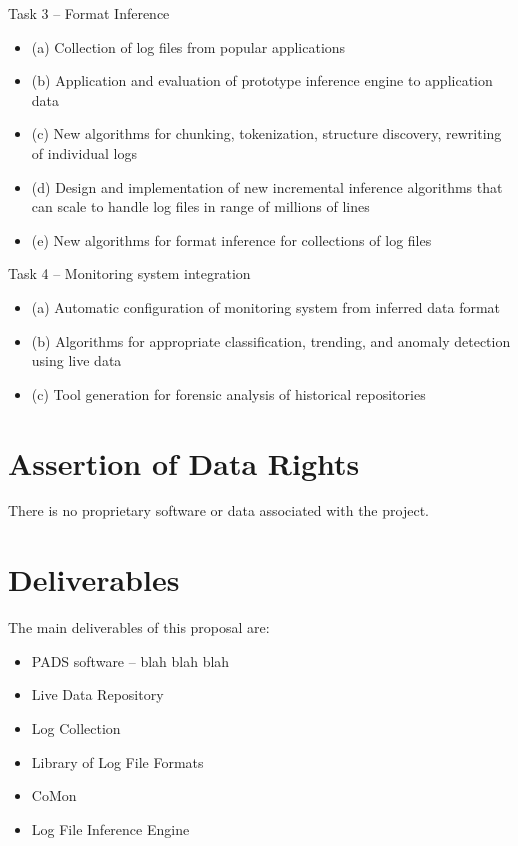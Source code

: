 \documentclass[12pt]{article}
\begin{document}
Task 3 -- Format Inference
\begin{itemize}
\item (a) Collection of log files from popular applications
\item (b) Application and evaluation of prototype inference engine to application data
\item (c) New algorithms for chunking, tokenization, structure discovery, rewriting of individual logs
\item (d) Design and implementation of new incremental inference algorithms that can scale to handle log files in range of millions of lines
\item (e) New algorithms for format inference for collections of log files
\end{itemize}

Task 4 -- Monitoring system integration
\begin{itemize}
\item (a) Automatic configuration of monitoring system from inferred data format
\item (b) Algorithms for appropriate classification, trending, and anomaly detection using live data
\item (c) Tool generation for forensic analysis of historical repositories
\end{itemize}

\section{Assertion of Data Rights}

There is no proprietary software or data associated with the project.

\newpage
\section{Deliverables}

The main deliverables of this proposal are:

\begin{itemize}
\item PADS software -- blah blah blah

\item Live Data Repository

\item Log Collection

\item Library of Log File Formats

\item CoMon

\item Log File Inference Engine

\end{itemize}
\end{document}
